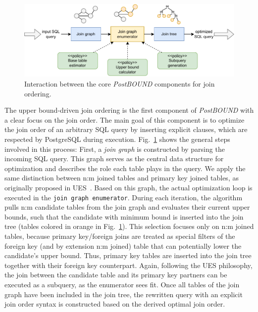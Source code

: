 \begin{figure}[tb]
	\centering
	\includegraphics[width=0.95\linewidth]{figures/postbound-interaction-rework.pdf}
	\caption{Interaction between the core \emph{PostBOUND} components for join ordering.}
	\label{fig:postbound-interaction}
	\vspace{-0.4cm}
\end{figure}

The upper bound-driven join ordering is the first component of \emph{PostBOUND} with a clear focus on the join order.  
The main goal of this component is to optimize the join order of an arbitrary SQL query by inserting explicit  clauses, which are respected by PostgreSQL during execution.
Fig.~\ref{fig:postbound-interaction} shows the general steps involved in this process:
First, a \emph{join graph} is constructed by parsing the incoming SQL query.
This graph serves as the central data structure for optimization and describes the role each table plays in the query. 
We apply the same distinction between n:m joined tables and primary key joined tables, as originally proposed in UES~\cite{hertzschuch-21-ues}.
Based on this graph, the actual optimization loop is executed in the \texttt{join graph enumerator}. 
During each iteration, the algorithm pulls n:m candidate tables from the join graph and evaluates their current upper bounds, such that the candidate with minimum bound is inserted into the join tree (tables colored in orange in Fig.~\ref{fig:postbound-interaction}).
This selection focuses only on n:m joined tables, because primary key/foreign joins are treated as special filters of the foreign key (and by extension n:m joined) table that can potentially lower the candidate's upper bound.
Thus, primary key tables are inserted into the join tree together with their foreign key counterpart. 
Again, following the UES philosophy, the join between the candidate table and its primary key partners can be executed as a subquery, as the enumerator sees fit.
Once all tables of the join graph have been included in the join tree, the rewritten query with an explicit join order syntax is constructed based on the derived optimal join order.

